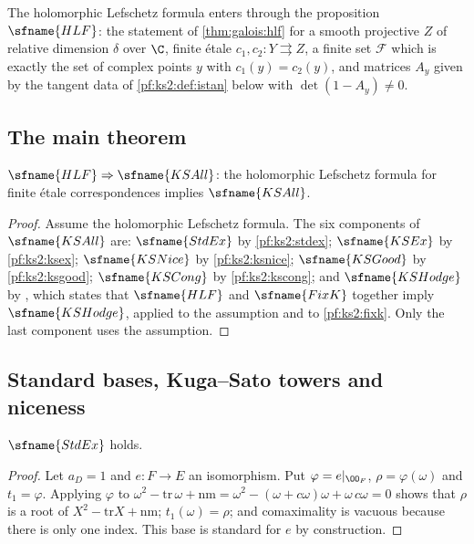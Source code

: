 The holomorphic Lefschetz formula enters through the proposition $\sfname{HLF}$: the statement of
\cref{thm:galois:hlf} for a smooth projective $Z$ of relative dimension $\delta$ over $\C$,
finite \'etale $c_1,c_2\colon Y\rightrightarrows Z$, a finite set $\mathcal F$ which is exactly the
set of complex points $y$ with $c_1(y)=c_2(y)$, and matrices $A_y$ given by the tangent data of
\cref{pf:ks2:def:istan} below with $\det(1-A_y)\ne0$.

\subsection{The main theorem}\label{pf:ks2:sec:main}

\begin{theorem}\label{pf:ks2:main}
$\sfname{HLF}\Rightarrow\sfname{KSAll}$: the holomorphic Lefschetz formula for finite \'etale
correspondences implies $\sfname{KSAll}$.
\end{theorem}

\begin{proof}
Assume the holomorphic Lefschetz formula. The six components of $\sfname{KSAll}$ are:
$\sfname{StdEx}$ by \cref{pf:ks2:stdex}; $\sfname{KSEx}$ by \cref{pf:ks2:ksex}; $\sfname{KSNice}$
by \cref{pf:ks2:ksnice}; $\sfname{KSGood}$ by \cref{pf:ks2:ksgood}; $\sfname{KSCong}$ by
\cref{pf:ks2:kscong}; and $\sfname{KSHodge}$ by
, which states that
$\sfname{HLF}$ and $\sfname{FixK}$ together imply $\sfname{KSHodge}$,
applied to the assumption and to \cref{pf:ks2:fixk}. Only the last component uses the
assumption.
\end{proof}

\subsection{Standard bases, Kuga--Sato towers and niceness}\label{pf:ks2:sec:std}

\begin{proposition}\label{pf:ks2:stdex}
$\sfname{StdEx}$ holds.
\end{proposition}

\begin{proof}
Let $a_D=1$ and $e\colon F\to E$ an isomorphism. Put $\varphi=e|_{\kstwoOF}$, $\rho=\varphi(\omega)$
and $t_1=\varphi$. Applying $\varphi$ to $\omega^2-\mathrm{tr}\,\omega+\mathrm{nm}=
\omega^2-(\omega+c\omega)\omega+\omega\,c\omega=0$ shows that $\rho$ is a root of
$X^2-\mathrm{tr}X+\mathrm{nm}$; $t_1(\omega)=\rho$; and comaximality is vacuous because there is
only one index. This base is standard for $e$ by construction.
\end{proof}

